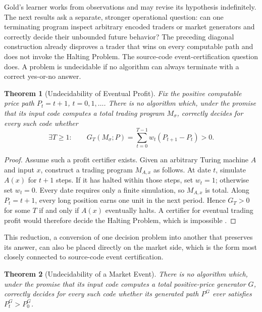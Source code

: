 \documentclass[aps,pra,reprint,superscriptaddress,amsmath,amssymb,floatfix]{revtex4-2}
\theoremstyle{plain}
\newtheorem{theorem}{Theorem}
\theoremstyle{definition}
\theoremstyle{remark}
\begin{document}
Gold's learner works from observations and may revise its hypothesis
indefinitely. The next results ask a separate, stronger operational question:
can one terminating program inspect arbitrary encoded traders or market
generators and correctly decide their unbounded future behavior? The preceding
diagonal construction already disproves a trader that wins on every computable
path and does not invoke the Halting Problem. The source-code
event-certification question does. A problem is undecidable if no algorithm
can always terminate with a correct yes-or-no answer.

\begin{theorem}[Undecidability of Eventual Profit]
  \label{thm:profit-undecidable}
  Fix the positive computable price path \(P_t=t+1\), \(t=0,1,\ldots\).
  There is no algorithm which, under the promise that its input code computes
  a total trading program \(M_\sigma\), correctly decides for every such code
  whether
  \[
    \exists T\geq1:\qquad
    G_T(M_\sigma;P)=
    \sum_{t=0}^{T-1}w_t(P_{t+1}-P_t)>0.
  \]
\end{theorem}

\begin{proof}
Assume such a profit certifier exists. Given an arbitrary Turing machine
\(A\) and input \(x\), construct a trading program \(M_{A,x}\) as follows.
At date \(t\), simulate \(A(x)\) for \(t+1\) steps. If it has halted within
those steps, set \(w_t=1\); otherwise set \(w_t=0\). Every date requires only
a finite simulation, so \(M_{A,x}\) is total. Along \(P_t=t+1\), every long
position earns one unit in the next period. Hence \(G_T>0\) for some \(T\) if
and only if \(A(x)\) eventually halts. A certifier for eventual trading profit
would therefore decide the Halting Problem, which is impossible
\cite{turing-36}.
\end{proof}

This reduction, a conversion of one decision problem into another that
preserves its answer, can also be placed directly on the market side, which is
the form most closely connected to source-code event certification.

\begin{theorem}[Undecidability of a Market Event]
  \label{thm:market-undecidable}
  There is no algorithm which, under the promise that its input code computes
  a total positive-price generator \(G\), correctly decides for every such
  code whether its generated path \(P^G\) ever satisfies \(P_t^G>P_0^G\).
\end{theorem}
\end{document}
